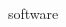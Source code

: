 \documentclass[12pt,t,aspectratio=169]{beamer}
\begin{document}
\begin{frame}[c]{software}

  \begin{columns}[c]
    \begin{column}{0.25\textwidth}
      \href{https://twitter.com/katiejolly6/status/1186685042992414720}{}

    \end{column}

    \begin{column}{0.25\textwidth}
      \href{https://twitter.com/dataandme/status/1187337297332715520}{}

    \end{column}

    \begin{column}{0.25\textwidth}
      \href{https://twitter.com/lisacrost/status/1186976243876536320}{}

    \end{column}

    \begin{column}{0.25\textwidth}
      \href{https://twitter.com/hadleywickham/status/1181578082295144450}{}

    \end{column}

  \end{columns}

\end{frame}
\end{document}
